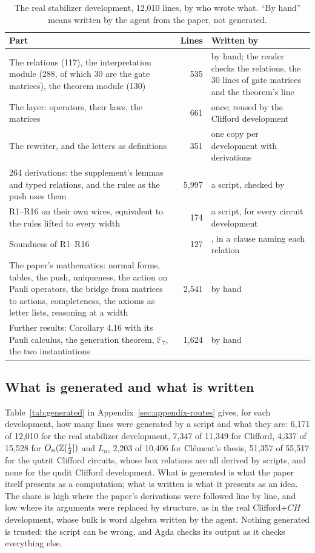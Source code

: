 \begin{table}
\caption{The real stabilizer development, 12{,}010 lines, by who wrote
what. ``By hand'' means written by the agent from the paper, not
generated.}
\label{tab:example}
\small
\begin{tabularx}{\linewidth}{@{}Y r Y@{}}
\toprule
Part & Lines & Written by \\
\midrule
The relations (117), the interpretation module (288, of which 30 are the gate matrices), the theorem module (130) & 535 & by hand; the reader checks the relations, the 30 lines of gate matrices and the theorem's line \\
The layer: operators, their laws, the matrices & 661 & once; reused by the Clifford development \\
The rewriter, and the letters as definitions & 351 & one copy per development with derivations \\
264 derivations: the supplement's lemmas and typed relations, and the rules as the push uses them & 5{,}997 & a script, checked by  \\
R1--R16 on their own wires, equivalent to the rules lifted to every width & 174 & a script, for every circuit development \\
Soundness of R1--R16 & 127 & , in a clause naming each relation \\
The paper's mathematics: normal forms, tables, the push, uniqueness, the action on Pauli operators, the bridge from matrices to actions, completeness, the axioms as letter lists, reasoning at a width & 2{,}541 & by hand \\
Further results: Corollary 4.16 with its Pauli calculus, the generation theorem, $\mathbb{F}_7$, the two instantiations & 1{,}624 & by hand \\
\bottomrule
\end{tabularx}
\end{table}

\subsection{What is generated and what is written}\label{sec:generated}

Table~\ref{tab:generated} in Appendix~\ref{sec:appendix-routes} gives,
for each development, how many lines were generated by a script and
what they are: 6{,}171 of 12{,}010 for the real stabilizer development,
7{,}347 of 11{,}349 for Clifford, 4{,}337 of 15{,}528 for
$O_n(\mathbb{Z}[\frac12])$ and $L_n$, 2{,}203 of 10{,}406 for Cl\'ement's thesis,
51{,}357 of 55{,}517 for the qutrit Clifford circuits, whose box
relations are all derived by scripts, and none for the qudit Clifford
development. What is
generated is what the paper itself presents as a computation; what is
written is what it presents as an idea. The share is high where the
paper's derivations were followed line by line, and low where its
arguments were replaced by structure, as in the real Clifford+$CH$
development, whose bulk is word algebra written by the agent. Nothing
generated is trusted: the script can be wrong, and Agda checks its
output as it checks everything else.
